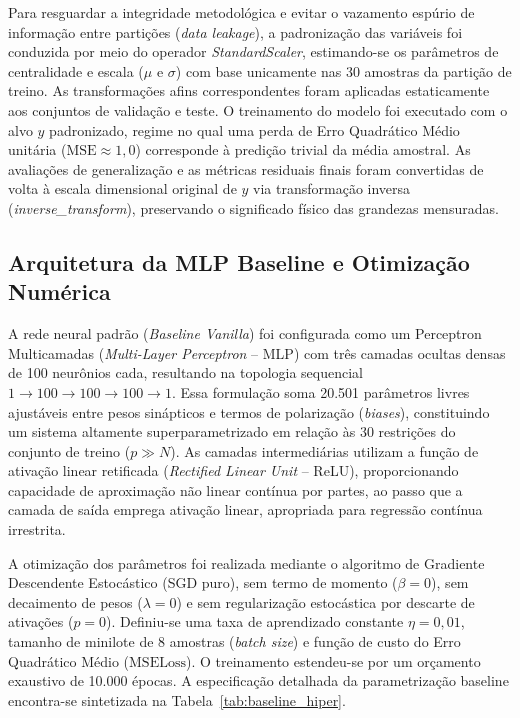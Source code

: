 \documentclass[11pt,a4paper]{article}
\begin{document}
Para resguardar a integridade metodológica e evitar o vazamento espúrio de informação entre partições (\textit{data leakage}), a padronização das variáveis foi conduzida por meio do operador \textit{StandardScaler}, estimando-se os parâmetros de centralidade e escala ($\mu$ e $\sigma$) com base unicamente nas 30 amostras da partição de treino. As transformações afins correspondentes foram aplicadas estaticamente aos conjuntos de validação e teste. O treinamento do modelo foi executado com o alvo $y$ padronizado, regime no qual uma perda de Erro Quadrático Médio unitária ($\mathrm{MSE} \approx 1{,}0$) corresponde à predição trivial da média amostral. As avaliações de generalização e as métricas residuais finais foram convertidas de volta à escala dimensional original de $y$ via transformação inversa (\textit{inverse\_transform}), preservando o significado físico das grandezas mensuradas.

\subsection{Arquitetura da MLP Baseline e Otimização Numérica}
A rede neural padrão (\textit{Baseline Vanilla}) foi configurada como um Perceptron Multicamadas (\textit{Multi-Layer Perceptron} -- MLP) com três camadas ocultas densas de 100 neurônios cada, resultando na topologia sequencial $1 \to 100 \to 100 \to 100 \to 1$. Essa formulação soma 20.501 parâmetros livres ajustáveis entre pesos sinápticos e termos de polarização (\textit{biases}), constituindo um sistema altamente superparametrizado em relação às 30 restrições do conjunto de treino ($p \gg N$). As camadas intermediárias utilizam a função de ativação linear retificada (\textit{Rectified Linear Unit} -- ReLU), proporcionando capacidade de aproximação não linear contínua por partes, ao passo que a camada de saída emprega ativação linear, apropriada para regressão contínua irrestrita.

A otimização dos parâmetros foi realizada mediante o algoritmo de Gradiente Descendente Estocástico (SGD puro), sem termo de momento ($\beta = 0$), sem decaimento de pesos ($\lambda = 0$) e sem regularização estocástica por descarte de ativações ($p = 0$). Definiu-se uma taxa de aprendizado constante $\eta = 0{,}01$, tamanho de minilote de 8 amostras (\textit{batch size}) e função de custo do Erro Quadrático Médio ($\mathrm{MSELoss}$). O treinamento estendeu-se por um orçamento exaustivo de 10.000 épocas. A especificação detalhada da parametrização baseline encontra-se sintetizada na Tabela~\ref{tab:baseline_hiper}.
\end{document}
